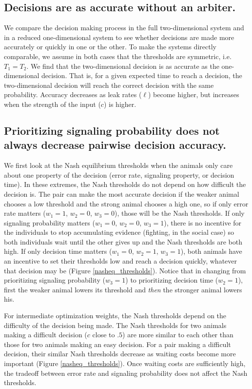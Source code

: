 \documentclass{article}
\begin{document}
\subsection{Decisions are as accurate without an arbiter. }
We compare the decision making process in the full two-dimensional system and in a reduced one-dimensional system to see whether decisions are made more accurately or quickly in one or the other.  To make the systems directly comparable, we assume in both cases that the thresholds are symmetric, i.e. $T_1=T_2$.  We find that the two-dimensional decision is as accurate as the one-dimensional decision.  That is, for a given expected time to reach a decision, the two-dimensional decision will reach the correct decision with the same probability.  Accuracy decreases as leak rates ($\ell$) become higher, but increases when the strength of the input ($c$) is higher.

\subsection{Prioritizing signaling probability does not always decrease pairwise decision accuracy. }
We first look at the Nash equilibrium thresholds when the animals only care about one property of the decision (error rate, signaling property, or decision time).  In these extremes, the Nash thresholds do not depend on how difficult the decision is. The pair can make the most accurate decision if the weaker animal chooses a low threshold and the strong animal chooses a high one, so if only error rate matters ($w_1=1$, $w_2=0$, $w_3=0$), those will be the Nash  thresholds.   If only signaling probability matters ($w_1=0$, $w_2=0$, $w_3=1$), there is no incentive for the individuals to stop accumulating evidence (fighting, in the social case) so both individuals wait until the other gives up and the Nash  thresholds are both high.  If only decision time matters ($w_1=0$, $w_2=1$, $w_3=1$), both animals have an incentive to set their thresholds low and reach a decision quickly, whatever that decision may be (Figure \ref{nasheq_thresholds}).   Notice that in changing from prioritizing signaling probability ($w_3=1$) to prioritizing decision time ($w_2=1$), first the weaker animal lowers its threshold and \emph{then} the stronger animal lowers his.  

For intermediate optimization weights, the Nash  thresholds depend on the difficulty of the decision being made.  The Nash thresholds for two animals making a difficult decision ($c$ close to $.5$) are more similar to each other than those for two animals making an easy decision.  For a pair making a difficult decision, their similar Nash thresholds decrease as waiting costs become more important (Figure \ref{nasheq_thresholds}).  Once waiting costs are sufficiently high, the tradeoff between error rate and signaling probability does not affect the Nash thresholds.
\end{document}
